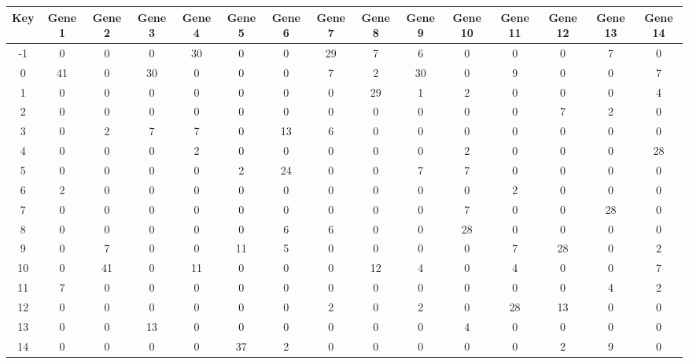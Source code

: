 \begin{tabular}{|c|c|c|c|c|c|c|c|c|c|c|c|c|c|c|}
\hline
Key & Gene 1 & Gene 2 & Gene 3 & Gene 4 & Gene 5 & Gene 6 & Gene 7 & Gene 8 & Gene 9 & Gene 10 & Gene 11 & Gene 12 & Gene 13 & Gene 14 \\
\hline
-1 & 0 & 0 & 0 & 30 & 0 & 0 & 29 & 7 & 6 & 0 & 0 & 0 & 7 & 0 \\
0 & 41 & 0 & 30 & 0 & 0 & 0 & 7 & 2 & 30 & 0 & 9 & 0 & 0 & 7 \\
1 & 0 & 0 & 0 & 0 & 0 & 0 & 0 & 29 & 1 & 2 & 0 & 0 & 0 & 4 \\
2 & 0 & 0 & 0 & 0 & 0 & 0 & 0 & 0 & 0 & 0 & 0 & 7 & 2 & 0 \\
3 & 0 & 2 & 7 & 7 & 0 & 13 & 6 & 0 & 0 & 0 & 0 & 0 & 0 & 0 \\
4 & 0 & 0 & 0 & 2 & 0 & 0 & 0 & 0 & 0 & 2 & 0 & 0 & 0 & 28 \\
5 & 0 & 0 & 0 & 0 & 2 & 24 & 0 & 0 & 7 & 7 & 0 & 0 & 0 & 0 \\
6 & 2 & 0 & 0 & 0 & 0 & 0 & 0 & 0 & 0 & 0 & 2 & 0 & 0 & 0 \\
7 & 0 & 0 & 0 & 0 & 0 & 0 & 0 & 0 & 0 & 7 & 0 & 0 & 28 & 0 \\
8 & 0 & 0 & 0 & 0 & 0 & 6 & 6 & 0 & 0 & 28 & 0 & 0 & 0 & 0 \\
9 & 0 & 7 & 0 & 0 & 11 & 5 & 0 & 0 & 0 & 0 & 7 & 28 & 0 & 2 \\
10 & 0 & 41 & 0 & 11 & 0 & 0 & 0 & 12 & 4 & 0 & 4 & 0 & 0 & 7 \\
11 & 7 & 0 & 0 & 0 & 0 & 0 & 0 & 0 & 0 & 0 & 0 & 0 & 4 & 2 \\
12 & 0 & 0 & 0 & 0 & 0 & 0 & 2 & 0 & 2 & 0 & 28 & 13 & 0 & 0 \\
13 & 0 & 0 & 13 & 0 & 0 & 0 & 0 & 0 & 0 & 4 & 0 & 0 & 0 & 0 \\
14 & 0 & 0 & 0 & 0 & 37 & 2 & 0 & 0 & 0 & 0 & 0 & 2 & 9 & 0 \\
\hline
\end{tabular}